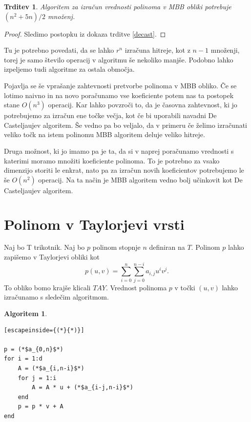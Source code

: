 \documentclass{article}
\newtheorem{algoritm}{Algoritem}[section]
\newtheorem{trditev}{Trditev}[section]
\begin{document}
\begin{trditev}
Algoritem za izračun vrednosti polinoma v MBB obliki potrebuje $(n^2+5n)/2$ množenj.
\end{trditev}
\begin{proof}
Sledimo postopku iz dokaza trditve \ref{decast}.
\end{proof}
Tu je potrebno povedati, da se lahko $r^n$ izračuna hitreje, kot z $n-1$ množenji, torej je samo število operacij v algoritmu še nekoliko manjše. Podobno lahko izpeljemo tudi algoritme za ostala območja.


\vspace{3mm}

Pojavlja se še vprašanje zahtevnosti pretvorbe polinoma v MBB obliko. Če se lotimo naivno in na novo poračunamo vse koeficiente potem nas ta postopek stane $O(n^3)$ operacij. Kar lahko povzroči to, da je časovna zahtevnost, ki jo potrebujemo za izračun ene točke večja, kot če bi uporabili navadni De Casteljaujev algoritem. Še vedno pa bo veljalo, da v primeru če želimo izračunati veliko točk na istem polinomu MBB algoritem deluje veliko hitreje.

Druga možnost, ki jo imamo pa je ta, da si v naprej poračunamo vrednosti s katerimi moramo množiti koeficiente polinoma. To je potrebno za vsako dimenzijo storiti le enkrat, nato pa za izračun novih koeficientov potrebujemo le še $O(n^2)$ operacij. Na ta način je MBB algoritem vedno bolj učinkovit kot De Casteljaujev algoritem.



\section{Polinom v Taylorjevi vrsti}

Naj bo T trikotnik. Naj bo $p$ polinom stopnje $n$ definiran na $T$. Polinom $p$ lahko zapišemo v Taylorjevi obliki kot 
$$p(u,v) = \sum_{i = 0}^n{\sum_{j=0}^{n-i}{a_{i,j}u^iv^j }}.$$To obliko bomo krajše klicali $TAY$.  Vrednost polinoma $p$ v točki $(u,v)$ lahko izračunamo s sledečim algoritmom.

\begin{algoritm}
\begin{lstlisting}[escapeinside={(*}{*)}]

p = (*$a_{0,n}$*)
for i = 1:d
    A = (*$a_{i,n-i}$*)
    for j = 1:i
        A = A * u + (*$a_{i-j,n-i}$*)
    end
    p = p * v + A
end
\end{lstlisting}
\end{algoritm}
\end{document}
